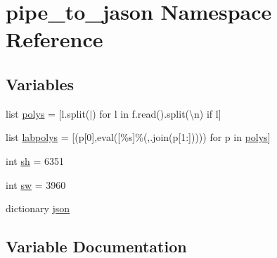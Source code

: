 \hypertarget{namespacepipe__to__jason}{}\section{pipe\+\_\+to\+\_\+jason Namespace Reference}
\label{namespacepipe__to__jason}
\subsection*{Variables}
\begin{DoxyCompactItemize}
\item 
list \hyperlink{namespacepipe__to__jason_a46919de99c7927437b5ad68cec346b4b}{polys} = \mbox{[}l.\+split(\textquotesingle{}$\vert$\textquotesingle{}) for l in f.\+read().split(\textquotesingle{}\textbackslash{}n\textquotesingle{}) if l\mbox{]}
\item 
list \hyperlink{namespacepipe__to__jason_a1b1f06e543adff6eecc4e0e4264104f5}{labpolys} = \mbox{[}(p\mbox{[}0\mbox{]},eval(\textquotesingle{}\mbox{[}\%s\mbox{]}\textquotesingle{}\%(\textquotesingle{},\textquotesingle{}.join(p\mbox{[}1\+:\mbox{]})))) for p in \hyperlink{namespacepipe__to__jason_a46919de99c7927437b5ad68cec346b4b}{polys}\mbox{]}
\item 
int \hyperlink{namespacepipe__to__jason_a50a7efe9831d8c4b8594f0f74fbb583b}{sh} = 6351
\item 
int \hyperlink{namespacepipe__to__jason_a8f7e88fdcb9e5bb9a360273857ee0671}{sw} = 3960
\item 
dictionary \hyperlink{namespacepipe__to__jason_a33ac92a87429be717ae3a29102c9d3a8}{json}
\end{DoxyCompactItemize}


\subsection{Variable Documentation}
\hypertarget{namespacepipe__to__jason_a33ac92a87429be717ae3a29102c9d3a8}{}
